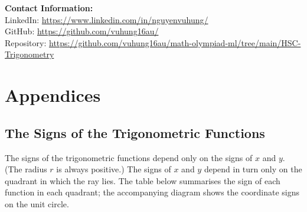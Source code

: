 \documentclass[12pt]{article}
\begin{document}
\vspace{2em}
\noindent\textbf{Contact Information:}\\[0.5em]
LinkedIn: \href{https://www.linkedin.com/in/nguyenvuhung/}{https://www.linkedin.com/in/nguyenvuhung/}\\[0.3em]
GitHub: \href{https://github.com/vuhung16au/}{https://github.com/vuhung16au/}\\[0.3em]
Repository: \href{https://github.com/vuhung16au/math-olympiad-ml/tree/main/HSC-Trigonometry}{https://github.com/vuhung16au/math-olympiad-ml/tree/main/HSC-Trigonometry}

\appendix
\section{Appendices}

\subsection{The Signs of the Trigonometric Functions}

The signs of the trigonometric functions depend only on the signs of $x$ and $y$. (The radius $r$ is always positive.) The signs of $x$ and $y$ depend in turn only on the quadrant in which the ray lies. The table below summarises the sign of each function in each quadrant; the accompanying diagram shows the coordinate signs on the unit circle.

\vspace{0.8em}
\end{document}
